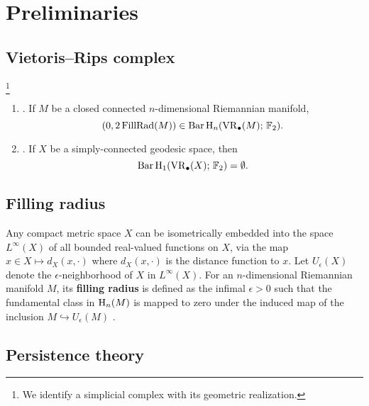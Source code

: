 
\section{Preliminaries}\label{s:preliminaries}

\subsection{Vietoris--Rips complex}\label{ss:vietoris-rips}

\footnote{We identify a simplicial complex with its geometric realization.}

\begin{enumerate}
	\item\label{prop:manifold} {\rm \cite[Prop.~9.4]{lim2020vietoris}}.
	If $M$ be a closed connected $n$-dimensional Riemannian manifold,
	\[
	(0,2\operatorname{FillRad}(M)) \in \operatorname{Bar} \operatorname{H}_{n}(\operatorname{VR}_\bullet(M);\,{\mathbb{F}_2}).
	\]

	\item\label{prop:pH1} {\rm \cite[Prop.~7.10]{virk20201}}.
	If $X$ be a simply-connected geodesic space, then
	\[
	\operatorname{Bar} \operatorname{H}_{1}(\operatorname{VR}_\bullet(X);\,{\mathbb{F}_2}) = \emptyset.
	\]
\end{enumerate}

\subsection{Filling radius}\label{ss:filling_radius}

Any compact metric space $X$ can be isometrically embedded into the space $L^\infty(X)$ of all bounded real-valued functions on $X$, via the map $x\in X\mapsto d_X(x,\cdot)$ where $d_X(x,\cdot)$ is the distance function to $x$. Let $U_\epsilon(X)$ denote the $\epsilon$-neighborhood of $X$ in $L^\infty(X)$.
For an $n$-dimensional Riemannian manifold $M$, its \textbf{filling radius} is defined as the infimal $\epsilon>0$ such that the fundamental class in $\operatorname{H}_n(M)$ is mapped to zero under the induced map of the inclusion $M\hookrightarrow U_\epsilon(M)$ \cite[page 108]{gromov2007metric}.

\subsection{Persistence theory}

